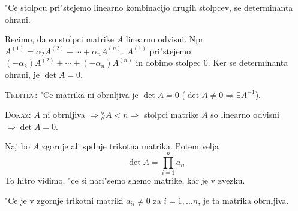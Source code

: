 "Ce stolpcu pri"stejemo linearno kombinacijo drugih stolpcev, se determinanta ohrani.

Recimo, da so stolpci matrike $A$ linearno odvisni. Npr $A^{(1)} = \alpha_2 A^{(2)} + \cdots + \alpha_n A^{(n)}$. $A^{(1)}$ pri"stejemo $(-\alpha_2)A^{(2)} + \cdots + (-\alpha_n)A^{(n)}$ in dobimo stolpec 0. Ker se determinanta ohrani, je $\det A = 0$.

\textsc{Trditev:} "Ce matrika ni obrnljiva je $\det A = 0$ ($\det A \neq 0 \Rightarrow \exists A^{-1}$).

\textsc{Dokaz:} $A$ ni obrnljiva $\Rightarrow \rang A < n \Rightarrow$ stolpci matrike $A$ so linearno odvisni $\Rightarrow \det A = 0$.

Naj bo $A$ zgornje ali spdnje trikotna matrika. Potem velja
\begin{equation*}
\det A = \prod_{i=1}^{n} a_{ii}
\end{equation*}
To hitro vidimo, "ce si nari"semo shemo matrike, kar je v zvezku.

"Ce je v zgornje trikotni matriki $a_{ii} \neq 0$ za $i = 1, \ldots n$, je ta matrika obrnljiva.